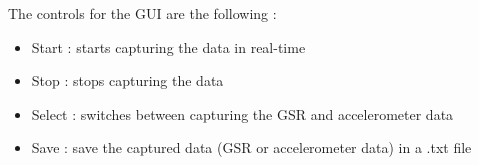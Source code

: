 \documentclass[12pt,a4paper]{article}
\begin{document}
The controls for the GUI are the following :
\begin{itemize}
  \item Start : starts capturing the data in real-time
  \item Stop : stops capturing the data
  \item Select : switches between capturing the GSR and accelerometer data
	\item Save : save the captured data (GSR or accelerometer data) in a .txt file
\end{itemize}
\end{document}
